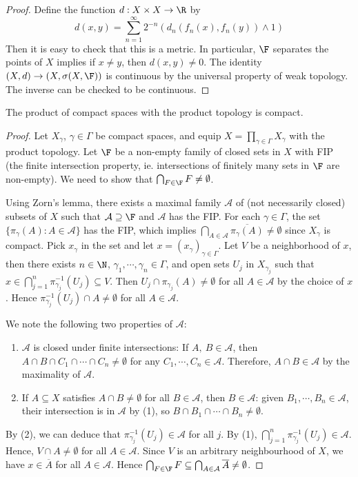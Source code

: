 \documentclass[a4paper]{article}
\begin{document}
\begin{proof}
  Define the function $d:X\times X\to\R$ by
  \[
    d(x,y)=\sum_{n=1}^\infty 2^{-n}(d_n(f_n(x),f_n(y))\land 1)
  \]
  Then it is easy to check that this is a metric. In particular, $\F$ separates the points of $X$ implies if $x\not= y$, then $d(x,y)\not= 0$. The identity $(X,d)\to(X,\sigma(X,\F))$ is continuous by the universal property of weak topology. The inverse can be checked to be continuous.
\end{proof}

\begin{nthm}\label{thm:Tychonoff}
  The product of compact spaces with the product topology is compact.
\end{nthm}

\begin{proof}
	Let $X_\gamma$, $\gamma\in\Gamma$ be compact spaces, and equip $X=\prod_{\gamma\in\Gamma}X_\gamma$ with the product topology. Let $\F$ be a non-empty family of closed sets in $X$ with FIP (the finite intersection property, ie. intersections of finitely many sets in $\F$ are non-empty). We need to show that $\bigcap_{F\in\F}F\not=\emptyset$.

	Using Zorn's lemma, there exists a maximal family $\mathcal{A}$ of (not necessarily closed) subsets of $X$ such that $\mathcal{A}\supseteq\F$ and $\mathcal{A}$ has the FIP. For each $\gamma\in\Gamma$, the set $\{\pi_\gamma(A):A\in\mathcal{A}\}$ has the FIP, which implies $\bigcap_{A\in\mathcal{A}}\overline{\pi_\gamma(A)}\not=\emptyset$ since $X_\gamma$ is compact. Pick $x_\gamma$ in the set and let $x=(x_\gamma)_{\gamma\in\Gamma}$. Let $V$ be a neighborhood of $x$, then there exists $n\in\N$, $\gamma_1,\cdots,\gamma_n\in\Gamma$, and open sets $U_j$ in $X_{\gamma_j}$ such that $x\in\bigcap_{j=1}^n\pi^{-1}_{\gamma_j}(U_j)\subseteq V$. Then $U_j\cap\pi_{\gamma_j}(A)\not=\emptyset$ for all $A\in\mathcal{A}$ by the choice of $x$. Hence $\pi_{\gamma_j}^{-1}(U_j)\cap A\not=\emptyset$ for all $A\in\mathcal{A}$.

	We note the following two properties of $\mathcal{A}$:
	\begin{enumerate}
		\item $\mathcal{A}$ is closed under finite intersections: If $A,\ B\in\mathcal{A}$, then $A\cap B\cap C_1\cap\cdots\cap C_n\not=\emptyset$ for any $C_1,\cdots,C_n\in\mathcal{A}$. Therefore, $A\cap B\in\mathcal{A}$ by the maximality of $\mathcal{A}$.
		\item If $A\subseteq X$ satisfies $A\cap B\not=\emptyset$ for all $B\in\mathcal{A}$, then $B\in\mathcal{A}$: given $B_1,\cdots,B_n\in\mathcal{A}$, their intersection is in $\mathcal{A}$ by (1), so $B\cap B_1\cap\cdots\cap B_n\not=\emptyset$.
	\end{enumerate}
	By (2), we can deduce that $\pi^{-1}_{\gamma_j}(U_j)\in\mathcal{A}$ for all $j$. By (1), $\bigcap_{j=1}^n\pi^{-1}_{\gamma_j}(U_j)\in\mathcal{A}$. Hence, $V\cap A\not=\emptyset$ for all $A\in\mathcal{A}$. Since $V$ is an arbitrary neighbourhood of $X$, we have $x\in\overline{A}$ for all $A\in\mathcal{A}$. Hence $\bigcap_{F\in\F}F\subseteq\bigcap_{A\in\mathcal{A}}\overline{A} \not=\emptyset$.
\end{proof}
\end{document}
